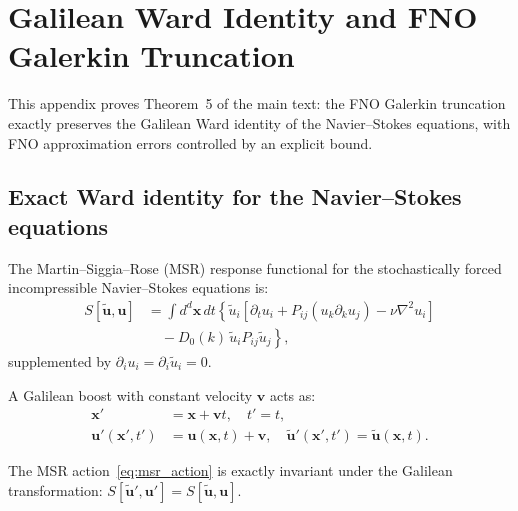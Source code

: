 \section{Galilean Ward Identity and FNO Galerkin Truncation\label{app:ward}}

This appendix proves Theorem~5 of the main text: the FNO Galerkin truncation exactly preserves the Galilean Ward identity of the Navier--Stokes equations, with FNO approximation errors controlled by an explicit bound.

\subsection{Exact Ward identity for the Navier--Stokes equations\label{app:ward_exact}}

The Martin--Siggia--Rose (MSR) response functional for the stochastically forced incompressible Navier--Stokes equations is:
\begin{equation}\label{eq:msr_action}
\begin{aligned}
S[\tilde{\mathbf{u}},\mathbf{u}] &= \int d^d\mathbf{x}\,dt\left\{\tilde{u}_i\left[\partial_t u_i + P_{ij}(u_k\partial_k u_j) - \nu\nabla^2 u_i\right] \right. \\
&\quad \left. {} - D_0(k)\,\tilde{u}_i P_{ij}\tilde{u}_j\right\},
\end{aligned}
\end{equation}
supplemented by $\partial_i u_i = \partial_i \tilde{u}_i = 0$.

A Galilean boost with constant velocity $\mathbf{v}$ acts as:
\begin{equation}
\begin{aligned}
\mathbf{x}' &= \mathbf{x} + \mathbf{v}t,\quad t' = t,\\
\mathbf{u}'(\mathbf{x}',t') &= \mathbf{u}(\mathbf{x},t) + \mathbf{v},\quad \tilde{\mathbf{u}}'(\mathbf{x}',t') = \tilde{\mathbf{u}}(\mathbf{x},t).
\end{aligned}
\end{equation}

\begin{theorem}\label{thm:action_inv}
The MSR action~\eqref{eq:msr_action} is exactly invariant under the Galilean transformation: $S[\tilde{\mathbf{u}}',\mathbf{u}'] = S[\tilde{\mathbf{u}},\mathbf{u}]$.
\end{theorem}

